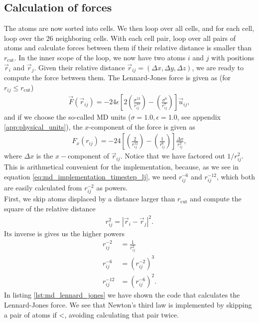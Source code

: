 \subsection{Calculation of forces}
The atoms are now sorted into cells. We then loop over all cells, and for each cell, loop over the 26 neighboring cells. With each cell pair, loop over all pairs of atoms and calculate forces between them if their relative distance is smaller than $r_\text{cut}$. In the inner scope of the loop, we now have two atoms $i$ and $j$ with positions $\vec r_i$ and $\vec r_j$. Given their relative distance $\vec r_{ij} = (\Delta x, \Delta y, \Delta z)$, we are ready to compute the force between them. The Lennard-Jones force is given as (for $r_{ij} \leq r_\text{cut}$)
\begin{align}
	\vec F(\vec r_{ij}) = -24\epsilon\left[2\left(\frac{\sigma^{12}}{r_{ij}^{13}}\right) - \left(\frac{\sigma^6}{r_{ij}^7}\right)\right]\vec u_{ij},
\end{align}
and if we choose the so-called MD units ($\sigma = 1.0, \epsilon = 1.0$, see appendix \ref{app:physical_units}), the $x$-component of the force is given as
\begin{align}
	\label{eq:md_implementation_timestep_lj}
	F_x(r_{ij}) = -24\left[\left(\frac{2}{r_{ij}^{12}}\right) - \left(\frac{1}{r_{ij}^6}\right)\right]\frac{\Delta x}{r_{ij}^2},
\end{align}
where $\Delta x$ is the $x-$component of $\vec r_{ij}$. Notice that we have factored out $1/r_{ij}^2$. This is arithmetical convenient for the implementation, because, as we see in equation \eqref{eq:md_implementation_timestep_lj}, we need $r_{ij}^{-6}$ and $r_{ij}^{-12}$, which both are easily calculated from $r_{ij}^{-2}$ as powers.\\
First, we skip atoms displaced by a distance larger than $r_\text{cut}$ and compute the square of the relative distance
\begin{align}
	r_{ij}^2 = \left|\vec r_i - \vec r_j\right|^2.
\end{align}
Its inverse is gives us the higher powers
\begin{align}
	r_{ij}^{-2} &= \frac{1}{r_{ij}^2}\\
	r_{ij}^{-6} &= \left(r_{ij}^{-2}\right)^3\\
	r_{ij}^{-12} &= \left(r_{ij}^{-6}\right)^2.
\end{align}
In listing \ref{lst:md_lennard_jones} we have shown the code that calculates the Lennard-Jones force. We see that Newton's third law is implemented by skipping a pair of atoms if <, avoiding calculating that pair twice. 
